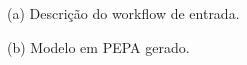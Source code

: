 \documentclass[a4paper,10pt]{article}
\begin{document}
\begin{figure}[h]
        \centering

        \begin{subfigure}[b]{0.6\textwidth}
                \footnotesize
                
                \normalsize
                (a) Descrição do workflow de entrada.\\

                    \scriptsize
                
                \normalsize
                (b) Modelo em PEPA gerado.\\

        \end{subfigure}%
        ~~%
        \begin{subfigure}[b]{0.4\textwidth}
                \centering

\end{subfigure}
\end{figure}
\end{document}
